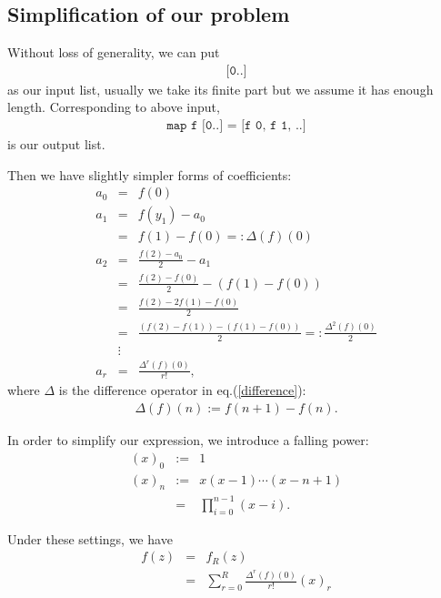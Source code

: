 \documentclass[11pt]{book}
\begin{document}
\subsection{Simplification of our problem}
Without loss of generality, we can put 
\begin{eqnarray}
\texttt{[0..]}
\end{eqnarray}
as our input list, usually we take its finite part but we assume it has enough length.
Corresponding to above input,
\begin{eqnarray}
\texttt{map f [0..] = [f 0, f 1, ..]}
\end{eqnarray}
is our output list.

Then we have slightly simpler forms of coefficients:
\begin{eqnarray}
a_0 &=& f(0) \\
a_1 &=& f(y_1) - a_0 \\
&=& f(1) - f(0) =: \Delta(f)(0) \\
a_2 &=& \frac{f(2)-a_0}{2}-a_1 \\
&=& \frac{f(2) - f(0)}{2} - \left( f(1) - f(0) \right) \\
&=& \frac{f(2)-2f(1)-f(0)}{2} \\
&=& \frac{\left( f(2)-f(1) \right) -\left(f(1)-f(0) \right)}{2} =: \frac{\Delta^2(f)(0)}{2} \\
\nonumber
&\vdots&\\
a_r &=& \frac{\Delta^r(f)(0)}{r!},
\end{eqnarray}
where $\Delta$ is the difference operator in eq.(\ref{difference}):
\begin{eqnarray}
\Delta(f)(n) := f(n+1) - f(n).
\end{eqnarray}

In order to simplify our expression, we introduce a falling power:
\begin{eqnarray}
(x)_0 &:=& 1 \\
(x)_n &:=& x(x-1) \cdots (x-n+1) \\
&=& \prod_{i=0}^{n-1} (x-i).
\end{eqnarray}

Under these settings, we have
\begin{eqnarray}
f(z) &=& f_R(z) \\
&=& \sum_{r=0}^R \frac{\Delta^r(f)(0)}{r!} (x)_r
\end{eqnarray}
\end{document}
